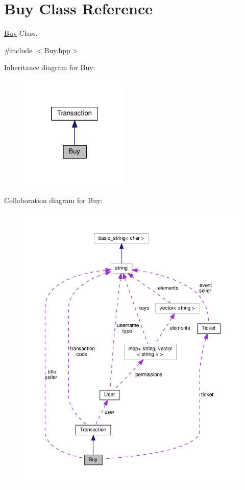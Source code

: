 \hypertarget{class_buy}{\section{Buy Class Reference}
\label{class_buy}
}


\hyperlink{class_buy}{Buy} Class.  




{\ttfamily \#include $<$Buy.\-hpp$>$}



Inheritance diagram for Buy\-:
\nopagebreak
\begin{figure}[H]
\begin{center}
\leavevmode
\includegraphics[width=148pt]{class_buy__inherit__graph}
\end{center}
\end{figure}


Collaboration diagram for Buy\-:
\nopagebreak
\begin{figure}[H]
\begin{center}
\leavevmode
\includegraphics[width=350pt]{class_buy__coll__graph}
\end{center}
\end{figure}

